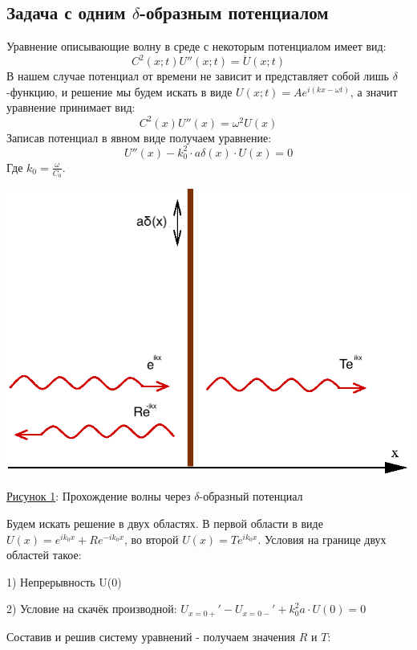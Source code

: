 \documentclass[11pt]{article}    %
\begin{document}
\subsection{Задача с одним $\delta$-образным потенциалом}
Уравнение описывающие волну в среде с некоторым потенциалом имеет вид:
\begin{equation}
    C^2(x; t) U''(x; t) = \ddot{U}(x; t)
\end{equation}
В нашем случае потенциал от времени не зависит и представляет собой лишь $\delta$-функцию, и решение мы будем искать в виде $U(x; t) = Ae^{i(kx-\omega t)}$, а значит уравнение принимает вид:
\begin{equation}
    C^2(x) U''(x) = \omega^2 U(x)
\end{equation}
Записав потенциал в явном виде получаем уравнение:
\begin{equation}
    U''(x) - k_0^2 \cdot a\delta(x) \cdot U(x) = 0
\end{equation}
Где $k_0 = \frac{\omega}{C_0}$.
\begin{center}
\includegraphics[scale = 0.6]{Deltapot.png}
\par
    \underline{Рисунок 1}: Прохождение волны через $\delta$-образный потенциал
\end{center}
Будем искать решение в двух областях.
В первой области в виде $U(x) = e^{ik_0x} + Re^{-ik_0x}$, во второй $U(x) = Te^{ik_0x}$.
Условия на границе двух областей такое:
\par 1) Непрерывность U(0)
\par 2) Условие на скачёк производной: $U_{x=0+}' - U_{x=0-}' + k_0^2 a \cdot U(0) = 0$
\par Составив и решив систему уравнений - получаем значения $R$ и $T$:
\end{document}
